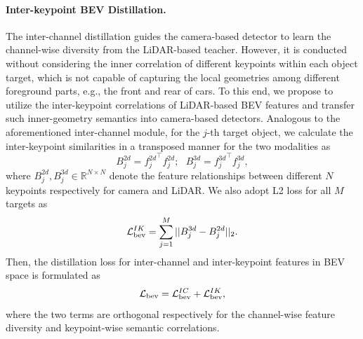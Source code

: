 

\paragraph{Inter-keypoint BEV Distillation.}
\label{sec:anchor}
The inter-channel distillation guides the camera-based detector to learn the channel-wise diversity from the LiDAR-based teacher. However, it is conducted without considering the inner correlation of different keypoints within each object target, which is not capable of capturing the local geometries among different foreground parts, e.g., the front and rear of cars. To this end, we propose to utilize the inter-keypoint correlations of LiDAR-based BEV features and transfer such inner-geometry semantics into camera-based detectors. Analogous to the aforementioned inter-channel module, for the $j$-th target object, we calculate the inter-keypoint similarities in a transposed manner for the two modalities as
\begin{equation}
    B_j^{2d} = {f_j^{2d}}^{\top} {f_j^{2d}};\ \ \ B_j^{3d} = {f_j^{3d}}^{\top} {f_j^{3d}},
\end{equation}
where $B_j^{2d}, B_j^{3d} \in {\mathbb{R}^{N\times N}}$ denote the feature relationships between different $N$ keypoints respectively for camera and LiDAR. We also adopt L2 loss for all $M$ targets as
\begin{equation}
    \mathcal{L}_{\rm{bev}}^{{IK}}= \sum_{j=1}^{M} ||B_j^{3d}-B_j^{2d}||_2.
    \label{eq:fm}
\end{equation}
Then, the distillation loss for inter-channel and inter-keypoint features in BEV space is formulated as
\begin{equation}
    \mathcal{L}_{\rm{bev}}=
    \mathcal{L}_{\rm{bev}}^{{IC}}+
    \mathcal{L}_{\rm{bev}}^{{IK}},
    \label{eq:seg}
\end{equation}
where the two terms are orthogonal respectively for the channel-wise feature diversity and keypoint-wise semantic correlations.

